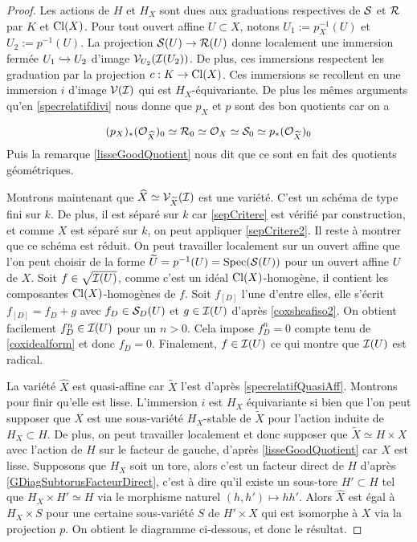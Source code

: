 \begin{proof}
Les actions de $H$ et $H_X$ sont dues aux graduations respectives de $\mathcal{S}$ et $\mathcal{R}$ par $K$ et $\operatorname{Cl}(X)$. Pour tout ouvert affine $U\subset X$, notons $U_1:=p_X^{-1}(U)$ et $U_2:=p^{-1}(U)$. La projection $\mathcal{S}(U)\rightarrow \mathcal{R}(U)$ donne localement une immersion fermée $U_1\xhookrightarrow{} U_2$ d'image $\mathcal{V}_{U_2}(\mathcal{I}(U_2))$. De plus, ces immersions respectent les graduation par la projection $c:K\rightarrow \operatorname{Cl}(X)$. Ces immersions se recollent en une immersion $i$ d'image $\mathcal{V}(\mathcal{I})$ qui est $H_X$-équivariante. De plus les mêmes arguments qu'en \ref{specrelatifdivi} nous donne que $p_X$ et $p$ sont des bon quotients car on a

$$(p_X)_*(\mathcal{O}_{\widehat{X}})_0\simeq \mathcal{R}_0\simeq\mathcal{O}_X\simeq\mathcal{S}_0\simeq  p_*(\mathcal{O}_{\widetilde{X}})_0$$
Puis la remarque \ref{lisseGoodQuotient} nous dit que ce sont en fait des quotients géométriques.

Montrons maintenant que $\widehat{X}\simeq \mathcal{V}_{\widetilde{X}}(\mathcal{I})$ est une variété. C'est un schéma de type fini sur $k$. De plus, il est séparé sur $k$ car \ref{sepCritere} est vérifié par construction, et comme $X$ est séparé sur $k$, on peut appliquer \ref{sepCritere2}. Il reste à montrer que ce schéma est réduit. On peut travailler localement sur un ouvert affine que l'on peut choisir de la forme $\widetilde{U}=p^{-1}(U)=\operatorname{Spec}(\mathcal{S}(U))$ pour un ouvert affine $U$ de $X$. Soit $f\in\sqrt{\mathcal{I}(U)}$, comme c'est un idéal $\operatorname{Cl}(X)$-homogène, il contient les composantes $\operatorname{Cl}(X)$-homogènes de $f$. Soit $f_{[D]}$ l'une d'entre elles, elle s'écrit $f_{[D]}=f_D+g$ avec $f_D\in \mathcal{S}_D(U)$ et $g\in\mathcal{I}(U)$ d'après \ref{coxsheafiso2}. On obtient facilement $f_D^n\in \mathcal{I}(U)$ pour un $n>0$. Cela impose $f_D^n=0$ compte tenu de \ref{coxidealform} et donc $f_D=0$. Finalement, $f\in\mathcal{I}(U)$ ce qui montre que $\mathcal{I}(U)$ est radical.

La variété $\widehat{X}$ est quasi-affine car $\widetilde{X}$ l'est d'après \ref{specrelatifQuasiAff}. Montrons pour finir qu'elle est lisse. L'immersion $i$ est $H_X$ équivariante si bien que l'on peut supposer que  $\widehat{X}$ est une sous-variété $H_X$-stable de $\widetilde{X}$ pour l'action induite de $H_X\subset H$. De plus, on peut travailler localement et donc supposer que $\widetilde{X}\simeq H\times X$ avec l'action de $H$ sur le facteur de gauche, d'après \ref{lisseGoodQuotient} car $X$ est lisse. Supposons que $H_X$ soit un tore, alors c'est un facteur direct de $H$ d'après \ref{GDiagSubtorusFacteurDirect}, c'est à dire qu'il existe un sous-tore $H'\subset H$ tel que $ H_X\times H'\simeq H$ via le morphisme naturel $(h,h')\mapsto hh'$. Alors $\widehat{X}$ est égal à $H_X\times S$ pour une certaine sous-variété $S$ de $H'\times X$ qui est isomorphe à $X$ via la projection $p$. On obtient le diagramme ci-dessous, et donc le résultat.


\end{proof}
